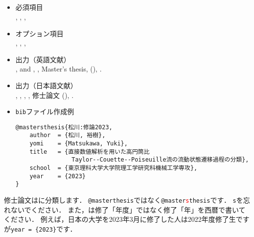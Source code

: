 \documentclass[a4paper,fleqn,uplatex,dvipdfmx]{jsarticle}
\begin{document}
\subsection{\ttmastersthesis}
\label{ssec:mastersthesis}
\begin{screen}
    \begin{itemize}
        \item 必須項目 \\
        \ttauthor, \tttitle, \ttschool, \ttyear
        \item オプション項目 \\
        \ttaddress, \ttmonth, \ttnote, \ttkey
        \item 出力（英語文献） \\
            \colorbox[gray]{0.8}{\ttauthorf}, \colorbox[gray]{0.8}{\ttauthors} and \colorbox[gray]{0.8}{\ttauthort}, \colorbox[gray]{0.8}{\tttitle}, Master's thesis, \colorbox[gray]{0.8}{\ttschool} (\colorbox[gray]{0.8}{\ttyear}), \colorbox[gray]{0.8}{\ttnote}.
        \item 出力（日本語文献） \\
            \colorbox[gray]{0.8}{\ttauthorf}, \colorbox[gray]{0.8}{\ttauthors}, \colorbox[gray]{0.8}{\ttauthort}, \colorbox[gray]{0.8}{\tttitle}, \colorbox[gray]{0.8}{\ttschool}修士論文 (\colorbox[gray]{0.8}{\ttyear}), \colorbox[gray]{0.8}{\ttnote}.
        \item \verb|bib|ファイル作成例 \vspace{-3mm}
\begin{verbatim}
@mastersthesis{松川:修論2023,
    author  = {松川, 裕樹},
    yomi    = {Matsukawa, Yuki},
    title   = {直接数値解析を用いた高円筒比
                Taylor--Couette--Poiseuille流の流動状態遷移過程の分類},
    school  = {東京理科大学大学院理工学研究科機械工学専攻},
    year    = {2023}
}
\end{verbatim}
    \end{itemize}
\end{screen}

修士論文は\ttmastersthesis に分類します．
\verb|@masterthesis|ではなく\texttt{@master\textcolor{red}{s}thesis}です．
\verb|s|を忘れないでください．
また，\ttyear は修了「年度」ではなく修了「年」を西暦で書いてください．
例えば，日本の大学を2023年3月に修了した人は2022年度修了生ですが\verb|year = {2023}|です．
\end{document}
